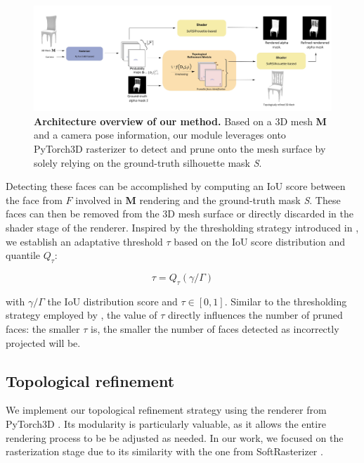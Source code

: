 \begin{figure}[htp!]
\begin{center}
\includegraphics[width=\linewidth]{images/adaptativesr/final_figure.jpg}
\end{center}
    \caption{\textbf{Architecture overview of our method.} Based on a 3D mesh \textbf{M} and a camera pose information, our module leverages onto PyTorch3D rasterizer to detect and prune onto the mesh surface by solely relying on the ground-truth silhouette mask \textit{S}.}
\label{fig:pipeline_overview}
\end{figure}

Detecting these faces can be accomplished by computing an \ac{IoU} score between the face from $F$ involved in \textbf{M} rendering and the ground-truth mask \textit{S}. These faces can then be removed from the 3D mesh surface or directly discarded in the shader stage of the renderer. Inspired by the thresholding strategy introduced in \citep{pan2019deep}, we establish an adaptative threshold $\tau$ based on the \ac{IoU} score distribution and quantile $Q_{\tau}$:

\begin{equation}
    \tau=Q_{\tau}({\gamma/\Gamma})
\end{equation}

\noindent with ${\gamma/\Gamma}$ the \ac{IoU} distribution score and $\tau \in [0,1]$. Similar to the thresholding strategy employed by \citep{pan2019deep}, the value of $\tau$ directly influences the number of pruned faces: the smaller $\tau$ is, the smaller the number of faces detected as incorrectly projected will be.

\subsection{Topological refinement}
We implement our topological refinement strategy using the renderer from PyTorch3D \citep{ravi2020accelarating}. Its modularity is particularly valuable, as it allows the entire rendering process to be  be adjusted as needed. In our work, we  focused on the rasterization stage due to its similarity with the one from SoftRasterizer \citep{liu2019soft}. 

